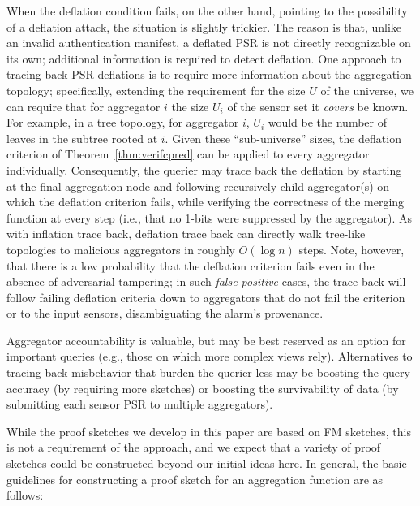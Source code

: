 \documentclass[10pt,twocolumn]{article}
\newcommand{\proofsketch}{proof sketch\xspace}
\newcommand{\proofsketches}{proof sketches\xspace}
\newcommand{\am}{authentication manifest\xspace}
\newcommand\vpar{{\vspace*{0.3em}}}
\newcommand{\stitle}[1]{\vpar\noindent{\bf #1\/}}
\begin{document}
{When the deflation condition fails, on the other hand, pointing to the
possibility of a deflation attack, the situation is slightly trickier.
The reason is that, unlike an invalid \am, a deflated PSR is not
directly recognizable on its own; additional information is required
to detect deflation.  One approach to tracing back PSR deflations
is to require more information about the aggregation topology;
specifically, extending the requirement for the size $U$ of the
universe, we can require that for aggregator $i$ the size $U_i$ of the
sensor set it \emph{covers} be known.  For example,
in a tree topology, for aggregator $i$, $U_i$ would be the number of
leaves in the subtree rooted at $i$.  Given these ``sub-universe''
sizes, the deflation criterion of Theorem~\ref{thm:verifcpred} can be
applied to every aggregator individually.  Consequently, the querier may
trace back the deflation by starting at the final aggregation node
and following recursively child aggregator(s)
on which the deflation criterion fails, while verifying the
correctness of the merging function at every step (i.e., that no 1-bits
were suppressed by the aggregator).  As with inflation trace back,
deflation trace back can directly walk tree-like topologies to
malicious aggregators in roughly $O(\log n)$ steps.
Note, however, that there is a low probability that the deflation
criterion fails even in the absence of adversarial tampering; in such
\emph{false positive} cases, the trace back will follow failing
deflation criteria down to aggregators  that do not fail the criterion
or to the input sensors, disambiguating the alarm's provenance.

Aggregator accountability is valuable, but
may be best reserved as an option for important queries (e.g., those on
which more complex views rely).  Alternatives to tracing back
misbehavior that burden the querier less may be boosting the query
accuracy (by requiring more sketches) or boosting the survivability of
data (by submitting each sensor PSR to multiple aggregators).

}






%
\stitle{A Generalized Template for Proof Sketches.}
While the \proofsketches we develop in this paper are based on
FM sketches, this is not a requirement of the approach, and we expect
that a variety of \proofsketches could be constructed beyond our
initial ideas here.  In general, the basic guidelines for constructing
a \proofsketch for an aggregation function are as follows:
\end{document}
